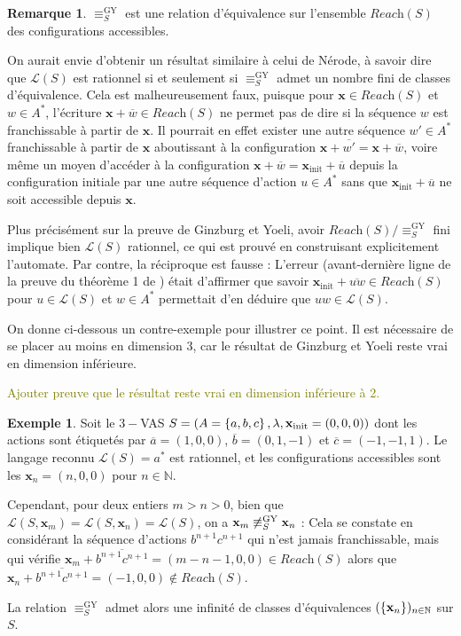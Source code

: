 \documentclass[a4paper,final]{article}
\theoremstyle{definition}
\newtheorem{Example}[Theorem]{Exemple}
\newtheorem*{Remark}{Remarque}
\newcommand{\lucas}[1]{\textcolor{olive}{#1}}
\newcommand{\os}[1]{\left\{\mathinner{#1}\right\}}
\newcommand{\N}{\ensuremath{\mathbb{N}}}
\newcommand{\lang}{\ensuremath{\mathcal{L}}}
\newcommand{\reach}{\ensuremath{\textit{Reach}}}
\newcommand{\vect}[1]{\ensuremath{\mathbf{#1}}}
\newcommand{\relGY}{\ensuremath{\equiv^\text{GY}_S}}
\newcommand{\xinit}{\ensuremath{\vect{x}_\text{init}}}
\newcommand{\valeur}[1]{\ensuremath{\overline{#1}}}
\begin{document}
\begin{Remark}
$\relGY$ est une relation d'équivalence sur l'ensemble $\reach(S)$ des configurations accessibles.
\end{Remark}

On aurait envie d'obtenir un résultat similaire à celui de Nérode, à savoir dire que $\lang(S)$ est rationnel si et seulement si $\relGY$ admet un nombre fini de classes d'équivalence.
Cela est malheureusement faux, puisque pour $\vect{x}\in\reach(S)$ et $w\in A^\ast$, l'écriture $\vect{x} +\valeur{w}\in\reach(S)$ ne permet pas de dire si la séquence $w$ est franchissable à partir de $\vect{x}$.
Il pourrait en effet exister une autre séquence $w'\in A^\ast$ franchissable à partir de $\vect{x}$ aboutissant à la configuration $\vect{x} +\valeur{w'} = \vect{x} +\valeur{w}$,
voire même un moyen d'accéder à la configuration $\vect{x} +\valeur{w} = \xinit +\valeur{u}$ depuis la configuration initiale par une autre séquence d'action $u\in A^\ast$ sans que $\xinit +\valeur{u}$ ne soit accessible depuis $\vect{x}$.

Plus précisément sur la preuve de Ginzburg et Yoeli, 
avoir $\reach(S)/\relGY$ fini implique bien $\lang(S)$ rationnel, ce qui est prouvé en construisant explicitement l'automate.
Par contre, la réciproque est fausse : 
L'erreur (avant-dernière ligne de la preuve du théorème 1 de \cite{giyo80}) était d'affirmer que savoir $\xinit +\valeur{uw}\in\reach(S)$ pour $u\in\lang(S)$ et $w\in A^\ast$ permettait d'en déduire que $uw\in\lang(S)$.

\vspace{5mm}

On donne ci-dessous un contre-exemple pour illustrer ce point.
Il est nécessaire de se placer au moins en dimension 3, car le résultat de Ginzburg et Yoeli reste vrai en dimension inférieure.

\lucas{Ajouter preuve que le résultat reste vrai en dimension inférieure à 2.}

\begin{Example}
Soit le $3-$VAS $S = (A=\os{a,b,c}, \lambda, \xinit=(0,0,0))$ dont les actions sont étiquetés par $\valeur{a}=(1,0,0)$, $\valeur{b}=(0,1,-1)$ et $\valeur{c}=(-1,-1,1)$.
Le langage reconnu $\lang(S)=a^\ast$ est rationnel, et les configurations accessibles sont les $\vect{x}_n=(n,0,0)$ pour $n\in\N$.

Cependant, pour deux entiers $m>n>0$, bien que $\lang(S,\vect{x}_m) =\lang(S,\vect{x}_n) =\lang(S)$, on a $\vect{x}_m \not\relGY \vect{x}_n$ :
Cela se constate en considérant la séquence d'actions $b^{n+1}c^{n+1}$ qui n'est jamais franchissable, mais qui vérifie $\vect{x}_m +\valeur{b^{n+1}c^{n+1}} = (m-n-1,0,0)\in \reach(S)$ alors que $\vect{x}_n +\valeur{b^{n+1}c^{n+1}} = (-1,0,0)\notin \reach(S)$.

La relation $\relGY$ admet alors une infinité de classes d'équivalences $(\os{\vect{x}_n})_{n\in\N}$ sur $S$.
\end{Example}
\fi
\end{document}

